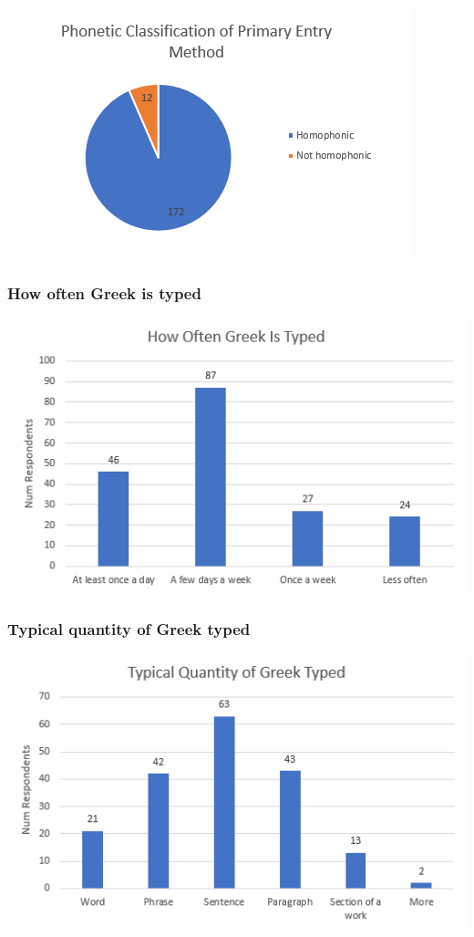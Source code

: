 \documentclass[11pt]{article}
\begin{document}
\begin{center}
\includegraphics[width=.9\linewidth]{./images/homophonic.PNG}
\end{center}

\subsubsection{How often Greek is typed}
\label{sec:org1430f87}

\begin{center}
\includegraphics[width=.9\linewidth]{./images/typing-frequency.PNG}
\end{center}

\subsubsection{Typical quantity of Greek typed}
\label{sec:org48198ed}

\begin{center}
\includegraphics[width=.9\linewidth]{./images/typing-quantity.PNG}
\end{center}
\end{document}
